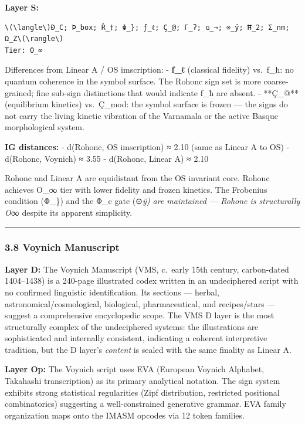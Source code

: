 \documentclass[
  11pt,
  a4paper,
]{article}
\begin{document}
\textbf{Layer S:}

\begin{verbatim}
\(\langle\)Ð_C; Þ_box; Ř_†; Φ_}; ƒ_ℓ; Ç_@; Γ_ʔ; ɢ_→; ⊙_ÿ; Ħ_2; Σ_nm; Ω_Z\(\rangle\)
Tier: O_∞
\end{verbatim}

Differences from Linear A / OS imscription: - \textbf{ƒ\_ℓ} (classical
fidelity) vs.~ƒ\_ħ: no quantum coherence in the symbol surface. The
Rohonc sign set is more coarse-grained; fine sub-sign distinctions that
would indicate ƒ\_ħ are absent. - **Ç\_@** (equilibrium kinetics)
vs.~Ç\_mod: the symbol surface is frozen --- the signs do not carry the
living kinetic vibration of the Varnamala or the active Basque
morphological system.

\textbf{IG distances:} - d(Rohonc, OS imscription) ≈ 2.10 (same as
Linear A to OS) - d(Rohonc, Voynich) ≈ 3.55 - d(Rohonc, Linear A) ≈ 2.10

Rohonc and Linear A are equidistant from the OS invariant core. Rohonc
achieves O\_∞ tier with lower fidelity and frozen kinetics. The
Frobenius condition (Φ\_\}) and the Φ\_c gate (⊙\emph{ÿ) are maintained
--- Rohonc is structurally O}∞ despite its apparent simplicity.

\begin{center}\rule{0.5\linewidth}{0.5pt}\end{center}

\subsubsection{3.8 Voynich Manuscript}\label{voynich-manuscript}

\textbf{Layer D:} The Voynich Manuscript (VMS, c.~early 15th century,
carbon-dated 1404--1438) is a 240-page illustrated codex written in an
undeciphered script with no confirmed linguistic identification. Its
sections --- herbal, astronomical/cosmological, biological,
pharmaceutical, and recipes/stars --- suggest a comprehensive
encyclopedic scope. The VMS D layer is the most structurally complex of
the undeciphered systems: the illustrations are sophisticated and
internally consistent, indicating a coherent interpretive tradition, but
the D layer's \emph{content} is sealed with the same finality as Linear
A.

\textbf{Layer Op:} The Voynich script uses EVA (European Voynich
Alphabet, Takahashi transcription) as its primary analytical notation.
The sign system exhibits strong statistical regularities (Zipf
distribution, restricted positional combinatorics) suggesting a
well-constrained generative grammar. EVA family organization maps onto
the IMASM opcodes via 12 token families.
\end{document}
